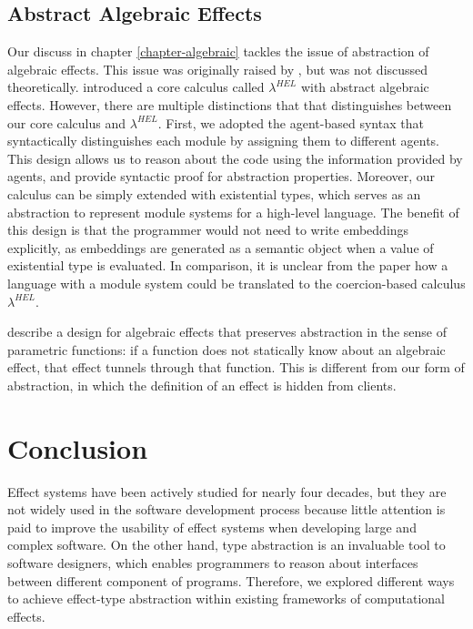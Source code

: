 \subsection{Abstract Algebraic Effects}
\label{related-abstract}
Our discuss in chapter \ref{chapter-algebraic} tackles the issue of abstraction of algebraic effects. This issue was originally raised by \citet{leijen18}, but was not discussed theoretically. \citet{biernacki19} introduced a core calculus called $\lambda^{HEL}$ with abstract algebraic effects. However, there are multiple distinctions that that distinguishes between our core calculus and $\lambda^{HEL}$. First, we adopted the agent-based syntax that syntactically distinguishes each module by assigning them to different agents. This design allows us to reason about the code using the information provided by agents, and provide syntactic proof for abstraction properties. Moreover, our calculus can be simply extended with existential types, which serves as an abstraction to represent module systems for a high-level language. The benefit of this design is that the programmer would not need to write embeddings explicitly, as embeddings are generated as a semantic object when a value of existential type is evaluated. In comparison, it is unclear from the paper \cite{biernacki19} how a language with a module system could be translated to the coercion-based calculus $\lambda^{HEL}$.

\citet{Zhang19} describe a design for algebraic effects that preserves abstraction in the sense of parametric functions: if a function does not statically know about an algebraic effect, that effect tunnels through that function.  This is different from our form of abstraction, in which the definition of an effect is hidden from clients.


\section{Conclusion}

Effect systems have been actively studied for nearly four decades, but they are not widely used in the software development process because little attention is paid to improve the usability of effect systems when developing large and complex software. On the other hand, type abstraction is an invaluable tool to software designers, which enables programmers to reason about interfaces between different component of programs. Therefore, we explored different ways to achieve effect-type abstraction within existing frameworks of computational effects.

